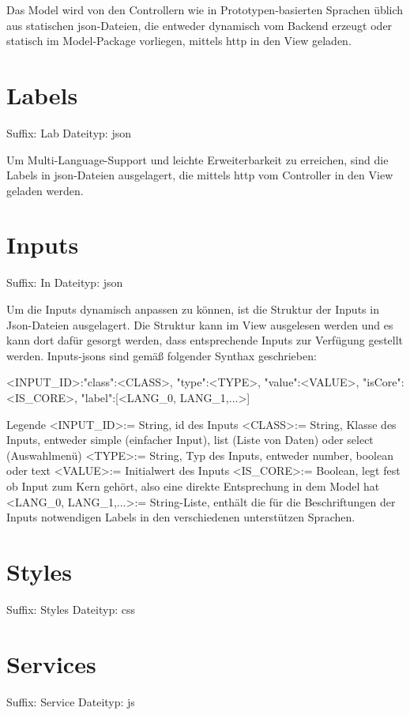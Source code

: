 Das Model wird von den Controllern wie in Prototypen-basierten Sprachen üblich aus statischen json-Dateien, die entweder dynamisch vom Backend erzeugt oder statisch im Model-Package vorliegen, mittels http in den View geladen.

\chapter{Labels}

Suffix: Lab
Dateityp: json

Um Multi-Language-Support und leichte Erweiterbarkeit zu erreichen, sind die Labels in
json-Dateien ausgelagert, die mittels http vom Controller in den View geladen werden.

\chapter{Inputs}

Suffix: In
Dateityp: json

Um die Inputs dynamisch anpassen zu können, ist die Struktur der Inputs in Json-Dateien ausgelagert. Die Struktur kann im View ausgelesen werden und es kann dort dafür gesorgt werden, dass entsprechende Inputs zur Verfügung gestellt werden. Inputs-jsons sind gemäß folgender Synthax geschrieben:

<INPUT_ID>:{"class":<CLASS>, "type":<TYPE>, "value":<VALUE>, "isCore":<IS_CORE>, "label":[<LANG_0, LANG_1,...>]}

Legende
<INPUT_ID>:= String, id des Inputs
<CLASS>:= String, Klasse des Inputs, entweder simple (einfacher Input), list (Liste von Daten) oder select (Auswahlmenü)
<TYPE>:= String, Typ des Inputs, entweder number, boolean oder text
<VALUE>:= Initialwert des Inputs
<IS_CORE>:= Boolean, legt fest ob Input zum Kern gehört, also eine direkte Entsprechung in dem Model hat
<LANG_0, LANG_1,...>:= String-Liste, enthält die für die Beschriftungen der Inputs notwendigen Labels in den verschiedenen unterstützen Sprachen.

\chapter{Styles}

Suffix: Styles
Dateityp: css

\chapter{Services}

Suffix: Service
Dateityp: js

